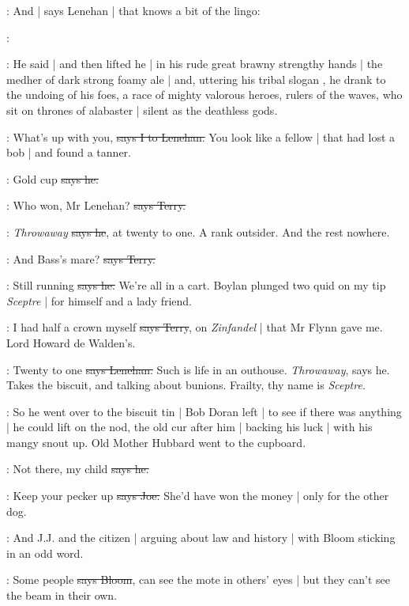 \Nq:
And |
says Lenehan |
that knows a bit of the lingo:

\lenehan:

:
He said |
and then lifted he
 |
in his rude great brawny strengthy hands |
the medher of dark strong foamy ale |
and,
uttering his tribal slogan ,
he drank to the undoing of his foes,
a race of mighty valorous heroes,
rulers of the waves,
who sit on thrones of alabaster |
silent as the deathless gods.

:
What's up with you,
\sout{says I to Lenehan.}
You look like a fellow |
that had lost a bob |
and found a tanner.

\lenehan:
Gold cup
\sout{says he.}

\terry:
Who won,
Mr Lenehan?
\sout{says Terry.}

\lenehan:
\emph{Throwaway}
\sout{says he},
at twenty to one.
A rank outsider.
And the rest nowhere.%

\terry:
And Bass's mare?
\sout{says Terry.}

\lenehan:
Still running
\sout{says he.}
We're all in a cart.
Boylan plunged two quid on my tip \emph{Sceptre} |
for himself and a lady friend.

\terry:
I had half a crown myself
\sout{says Terry},
on \emph{Zinfandel} |
that Mr Flynn gave me.
Lord Howard de Walden's.

\lenehan:
Twenty to one
\sout{says Lenehan.}
Such is life in an outhouse.
\emph{Throwaway},
says he.
Takes the biscuit,
and talking about bunions.
Frailty,
thy name is \emph{Sceptre.}

\Nq:
So he went over to the biscuit tin |
Bob Doran left |
to see if there was anything |
he could lift on the nod,
the old cur after him |
backing his luck |
with his mangy snout up.
Old Mother Hubbard went to the cupboard.

\lenehan:
Not there,
my child
\sout{says he.}

\joe:
Keep your pecker up
\sout{says Joe.}
She'd have won the money |
only for the other dog.

\Nq:
And J.J. and the citizen |
arguing about law and history |
with Bloom sticking in an odd word.

\Bloom:
Some people
\sout{says Bloom},
can see the mote in others' eyes |
but they can't see the beam in their own.

